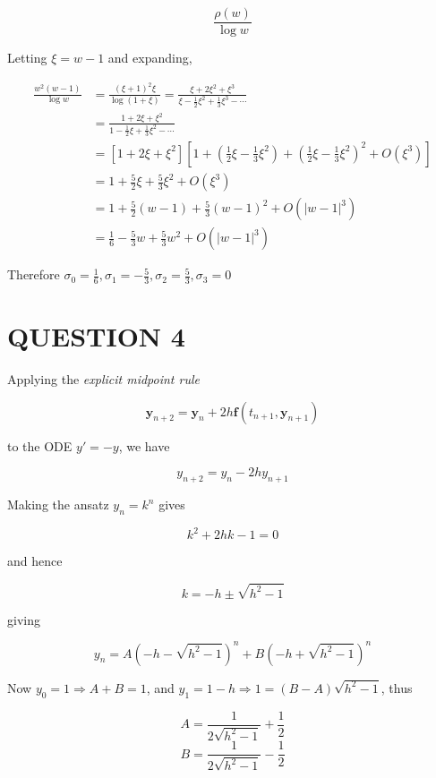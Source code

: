 \documentclass[a4paper]{article}
\begin{document}
\[ \frac{\rho(w)}{\log w} \]


Letting $ \xi = w - 1 $ and expanding,

\begin{align*}
\frac{w^{2}(w-1)}{\log w} & = \frac{(\xi + 1)^{2}\xi}{\log (1 + \xi)} = \frac{\xi + 2 \xi^{2} + \xi^{3}}{\xi - \frac{1}{2} \xi^{2} + \frac{1}{3} \xi^{3} - \cdots } \\
& = \frac{1 + 2 \xi + \xi^{2}}{1 - \frac{1}{2} \xi + \frac{1}{3} \xi^{2} - \cdots} \\
& = [1 + 2 \xi + \xi^{2}][ 1 + (\frac{1}{2} \xi - \frac{1}{3} \xi^{2}) + (\frac{1}{2} \xi - \frac{1}{3} \xi^{2})^{2} + O(\xi^{3})     ] \\
& = 1 + \frac{5}{2} \xi + \frac{5}{3} \xi^{2} + O(\xi^{3}) \\
& = 1 + \frac{5}{2} (w - 1) + \frac{5}{3} (w - 1)^{2} + O(| w-1 |^{3}) \\
& = \frac{1}{6} - \frac{5}{3} w + \frac{5}{3} w^{2} +  O(| w-1 |^{3})
\end{align*}

Therefore $ \sigma_{0} = \frac{1}{6} , \sigma_{1} = - \frac{5}{3}  , \sigma_{2} = \frac{5}{3}  , \sigma_{3} = 0 $


\section{QUESTION 4}

Applying the \emph{explicit midpoint rule}

\[ \mathbf{y}_{n+2} = \mathbf{y}_{n} + 2 h \mathbf{f}(t_{n+1},\mathbf{y}_{n+1}) \]

to the ODE $ y' = - y $, we have


\[ y_{n+2} = y_{n} - 2hy_{n+1} \]

Making the ansatz $ y_{n} = k^{n} $ gives

\[ k^{2} + 2hk - 1 = 0 \]

and hence

\[ k = -h  \pm \sqrt{h^{2} - 1} \]

giving 

\[ y_{n} = A \left(   -h  - \sqrt{h^{2} - 1} \right)^{n} + B  \left(   -h  + \sqrt{h^{2} - 1} \right)^{n}   \]

Now $ y_{0} = 1 \Rightarrow A + B = 1 $, and $ y_{1} = 1 - h \Rightarrow 1 = (B - A) \sqrt{h^{2} - 1} $, thus 

\[ A = \frac{1}{2 \sqrt{h^{2} - 1}} + \frac{1}{2}  \]
\[ B = \frac{1}{2 \sqrt{h^{2} - 1}} - \frac{1}{2}  \]
\end{document}
